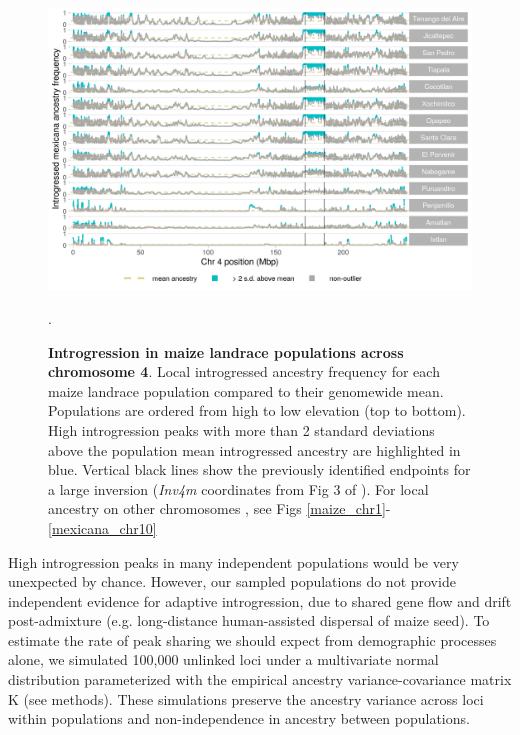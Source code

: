 \begin{figure}[ht]
\includegraphics[width=.95\textwidth]{chapter2/figures/maize_shared_outliers_chr_4.png}
\caption{\color{Gray} \textbf{Introgression in maize landrace populations across chromosome 4}. Local introgressed ancestry frequency for each maize landrace population compared to their genomewide mean. Populations are ordered from high to low elevation (top to bottom). High introgression peaks with more than 2 standard deviations above the population mean introgressed \mexicana ancestry are highlighted in blue. Vertical black lines show the previously identified endpoints for a large inversion (\textit{Inv4m} coordinates from Fig 3 of \cite{Pyhajarvi:2013jc}). For local ancestry on other chromosomes , see Figs \ref{maize_chr1}-\ref{mexicana_chr10}}. 
\label{maize_chr4}
\end{figure}
High introgression peaks in many independent populations would be very unexpected by chance. However, our sampled populations do not provide independent evidence for adaptive introgression, due to shared gene flow and drift post-admixture (e.g. long-distance human-assisted dispersal of maize seed). To estimate the rate of peak sharing we should expect from demographic processes alone, we simulated 100,000 unlinked loci under a multivariate normal distribution parameterized with the empirical ancestry variance-covariance matrix K (see methods). 
These simulations preserve the ancestry variance across loci within populations and non-independence in ancestry between populations.

